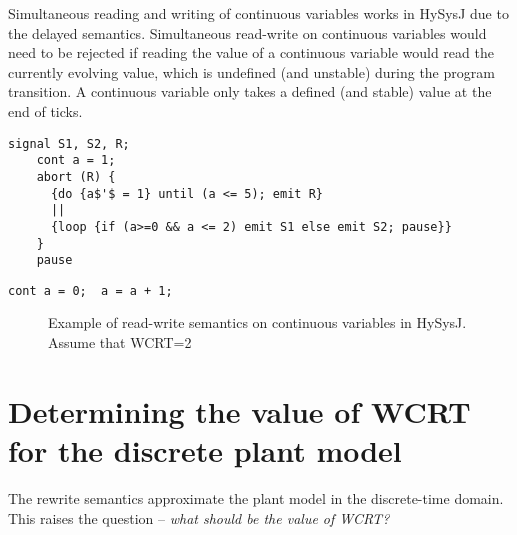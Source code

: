 \documentclass[10pt,journal,cspaper,compsoc]{IEEEtran}
\begin{document}
Simultaneous reading and writing of continuous variables works in HySysJ
due to the delayed semantics. Simultaneous read-write on continuous
variables would need to be rejected if reading the value of a continuous
variable would read the currently evolving value, which is undefined
(and unstable) during the program transition. A continuous variable only
takes a defined (and stable) value at the end of ticks.

\newbox{\iecf}
\begin{lrbox}{\iecf}
  \begin{lstlisting}[mathescape,style=sysj,morekeywords={until,cont,signal,loop,abort,await,emit,present,trap,pause,exit,delay,suspend}]
    signal S1, S2, R;
    cont a = 1;
    abort (R) {
      {do {a$'$ = 1} until (a <= 5); emit R} 
      || 
      {loop {if (a>=0 && a <= 2) emit S1 else emit S2; pause}}
    }
    pause
  \end{lstlisting}
\end{lrbox}

\newbox{\iecs}
\begin{lrbox}{\iecs}
  \begin{lstlisting}[mathescape,style=sysj,morekeywords={until,cont,signal,loop,abort,await,emit,present,trap,pause,exit,delay,suspend}]
    cont a = 0;  a = a + 1;
  \end{lstlisting}
\end{lrbox}

\begin{figure}[t!]
  \centering {}

  \caption{Example of read-write semantics on continuous variables in
    HySysJ. Assume that WCRT=2}
  \label{fig:13}
\end{figure}





\section{Determining the value of WCRT for the discrete plant model}
\label{sec:determ-value-wcrt}

The rewrite semantics approximate the plant model in the discrete-time
domain. This raises the question -- \textit{what should be the value of
  WCRT?}
\end{document}
